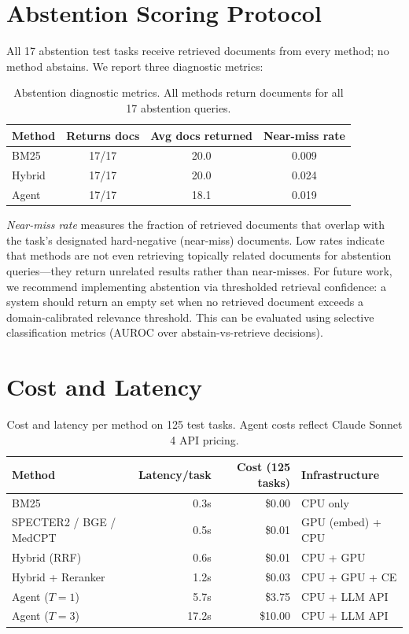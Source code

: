\documentclass{article}
\begin{document}
\section{Abstention Scoring Protocol}
\label{app:abstention_protocol}

All 17 abstention test tasks receive retrieved documents from every method; no method abstains. We report three diagnostic metrics:

\begin{table}[ht]
\centering
\caption{Abstention diagnostic metrics. All methods return documents for all 17 abstention queries.}
\small
\begin{tabular}{lccc}
\toprule
\textbf{Method} & \textbf{Returns docs} & \textbf{Avg docs returned} & \textbf{Near-miss rate} \\
\midrule
BM25 & 17/17 & 20.0 & 0.009 \\
Hybrid & 17/17 & 20.0 & 0.024 \\
Agent & 17/17 & 18.1 & 0.019 \\
\bottomrule
\end{tabular}
\end{table}

\emph{Near-miss rate} measures the fraction of retrieved documents that overlap with the task's designated hard-negative (near-miss) documents. Low rates indicate that methods are not even retrieving topically related documents for abstention queries---they return unrelated results rather than near-misses. For future work, we recommend implementing abstention via thresholded retrieval confidence: a system should return an empty set when no retrieved document exceeds a domain-calibrated relevance threshold. This can be evaluated using selective classification metrics (AUROC over abstain-vs-retrieve decisions).

\section{Cost and Latency}
\label{app:cost}

\begin{table}[ht]
\centering
\caption{Cost and latency per method on 125 test tasks. Agent costs reflect Claude Sonnet 4 API pricing.}
\small
\begin{tabular}{lrrl}
\toprule
\textbf{Method} & \textbf{Latency/task} & \textbf{Cost (125 tasks)} & \textbf{Infrastructure} \\
\midrule
BM25 & 0.3s & \$0.00 & CPU only \\
SPECTER2 / BGE / MedCPT & 0.5s & \$0.01 & GPU (embed) + CPU \\
Hybrid (RRF) & 0.6s & \$0.01 & CPU + GPU \\
Hybrid + Reranker & 1.2s & \$0.03 & CPU + GPU + CE \\
Agent ($T{=}1$) & 5.7s & \$3.75 & CPU + LLM API \\
Agent ($T{=}3$) & 17.2s & \$10.00 & CPU + LLM API \\
\bottomrule
\end{tabular}
\end{table}
\end{document}
